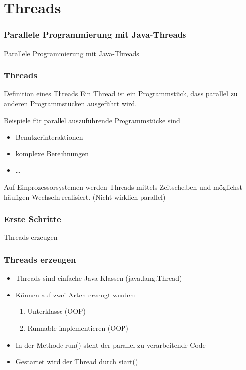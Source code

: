 \section{Threads}
\begin{frame}
\frametitle{Parallele Programmierung mit Java-Threads}
	\huge Parallele Programmierung mit Java-Threads
\end{frame}

\begin{frame}
\frametitle{Threads}
	\begin{exampleblock}{Definition eines Threads}
		Ein Thread ist ein Programmstück, dass parallel zu anderen Programmstücken
		ausgeführt wird.
	\end{exampleblock}
	Beispiele für parallel auszuführende Programmstücke sind
	\begin{itemize}
	  \item Benutzerinteraktionen
	  \item komplexe Berechnungen
	  \item \ldots
	\end{itemize}
	Auf Einprozessorsystemen werden Threads mittels Zeitscheiben und
	möglichst häufigen Wechseln realisiert. (Nicht wirklich parallel)
\end{frame}

\begin{frame}[fragile]
	\frametitle{Erste Schritte}
	\huge Threads erzeugen
\end{frame}
\begin{frame}
\frametitle{Threads erzeugen}
	\begin{itemize}
	  \item Threads sind einfache Java-Klassen (java.lang.Thread)
	  \item Können auf zwei Arten erzeugt werden:
	  \begin{enumerate}
	    \item Unterklasse (OOP)
	    \item Runnable implementieren (OOP)
	  \end{enumerate}
	  \item In der Methode run() steht der parallel zu verarbeitende Code
	  \item Gestartet wird der Thread durch start()
	\end{itemize}
\end{frame}

